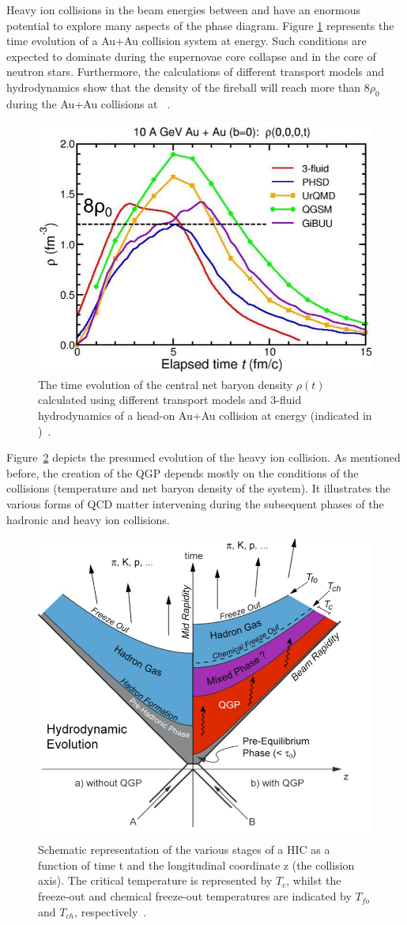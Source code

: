 Heavy ion collisions in the beam energies between  and  have an enormous potential to explore many aspects of the phase diagram. Figure \ref{fig:cbm_density} represents the time evolution of a Au+Au collision system at  energy. Such conditions are expected to dominate during the supernovae core collapse and in the core of neutron stars. Furthermore, the calculations of different transport models and hydrodynamics show that the density of the fireball will reach more than $8\rho_{0}$ during the Au+Au collisions at ~\cite{CBM_physics}.
\newpage
\begin{figure}[!h]
    \centering
    \includegraphics[width=0.65\columnwidth]{Chapter1/images/CBM_density.png}
    \caption{The time evolution of the central net baryon density $\rho(t)$ calculated using different transport models and 3-fluid hydrodynamics of a head-on Au+Au collision at  energy (indicated in \agev{})~\cite{CBM_physics}.}
    \label{fig:cbm_density}
\end{figure}

Figure~\ref{fig_heavyion} depicts the presumed evolution of the heavy ion collision. As mentioned before, the creation of the \gls{QGP} depends mostly on the conditions of the collisions (temperature and net baryon density of the system). It illustrates the various forms of QCD matter intervening during the subsequent phases of the hadronic and heavy ion collisions.
\begin{figure}[!h]
\centering
 \includegraphics[width=0.6\columnwidth]{Chapter1/images/heavyion.png}
\caption{Schematic representation of the various stages of a HIC as a function of time t and the longitudinal coordinate z (the collision axis). The critical temperature is represented by $T_c$, whilst the freeze-out and chemical freeze-out temperatures are indicated by $T_{fo}$ and $T_{ch}$, respectively~\cite{Sahoo:2745520}.}
\label{fig_heavyion}
\end{figure}

